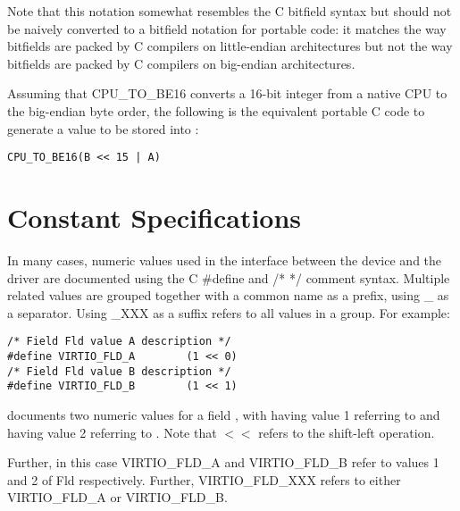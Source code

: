 Note that this notation somewhat resembles the C bitfield syntax but
should not be naively converted to a bitfield notation for portable
code: it matches the way bitfields are packed by C compilers on
little-endian architectures but not the way bitfields are packed by C
compilers on big-endian architectures.

Assuming that CPU_TO_BE16 converts a 16-bit integer from a native
CPU to the big-endian byte order, the following is the equivalent
portable C code to generate a value to be stored into :
\begin{lstlisting}
CPU_TO_BE16(B << 15 | A)
\end{lstlisting}
\section{Constant Specifications}\label{sec:Constant Specifications}

In many cases, numeric values used in the interface between the device
and the driver are documented using the C \#define and /* */
comment syntax. Multiple related values are grouped together with
a common name as a prefix, using _ as a separator.
Using _XXX as a suffix refers to all values in a group.
For example:

\begin{lstlisting}
/* Field Fld value A description */
#define VIRTIO_FLD_A        (1 << 0)
/* Field Fld value B description */
#define VIRTIO_FLD_B        (1 << 1)
\end{lstlisting}
documents two numeric values for a field , with
 having value 1 referring to  and 
having value 2 referring to .
Note that $<<$ refers to the shift-left operation.

Further, in this case VIRTIO_FLD_A and VIRTIO_FLD_B
refer to values 1 and 2 of Fld respectively. Further, VIRTIO_FLD_XXX refers to
either VIRTIO_FLD_A or VIRTIO_FLD_B.

\newpage

